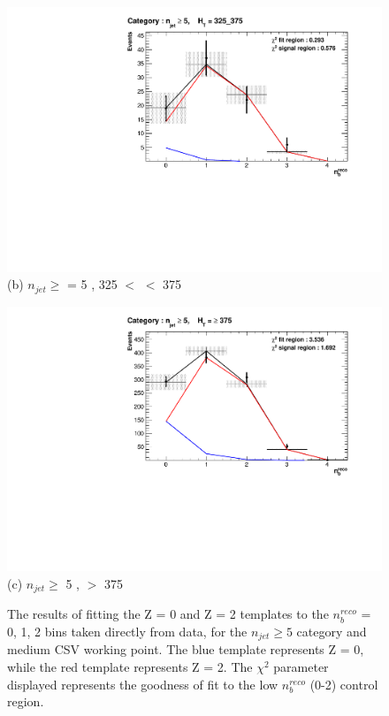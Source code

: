 \begin{figure}[ht]
\footnotesize
\centering
\begin{minipage}[b]{0.51\linewidth}
\includegraphics[width = 1.0\linewidth]{plots/ThesisPlots/Final_Fit_To_Data_Normal_Medium_HTBin_OneMuon_325_375_jet_mult_5.pdf}
\centering (b) $n_{jet} \geq$ = 5 , 325 $<$ \theht $<$ 375 
\end{minipage}
\quad
\begin{minipage}[b]{0.51\linewidth}
\centering
\includegraphics[width = 1.0\linewidth]{plots/ThesisPlots/Final_Fit_To_Data_Normal_Medium_HTBin_OneMuon_Template_375_jet_mult_5.pdf}
\centering (c) $n_{jet} \geq$ 5 , \theht $>$ 375 
\end{minipage}
\caption[The results of fitting the Z = 0 and Z = 2 templates to the $n_{b}^{reco}$ = 0, 1, 2 bins taken from data, for the $n_{jet} \geq 5$ category and medium \ac{CSV} working point.]{The results of fitting the Z = 0 and Z = 2 templates to the $n_{b}^{reco}$ = 0, 1, 2 bins taken directly from data, for the $n_{jet} \geq 5$ category and medium \ac{CSV} working point. The blue template represents Z = 0, while the red template represents Z = 2. The $\chi^{2}$ parameter displayed represents the goodness of fit to the low $n_{b}^{reco}$ (0-2) control region.}
\label{fig:template_data_med_njet5}
\end{figure}

